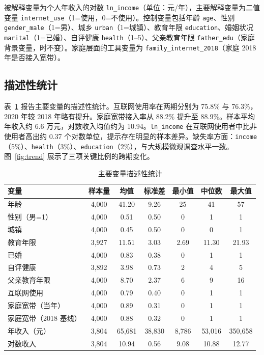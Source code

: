 \documentclass[a4paper,11pt]{article}
\begin{document}
被解释变量为个人年收入的对数 \texttt{ln\_income}（单位：元/年），主要解释变量为二值变量 \texttt{internet\_use}（1=使用，0=不使用）。控制变量包括年龄 \texttt{age}、性别 \texttt{gender\_male}（1=男）、城乡 \texttt{urban}（1=城镇）、教育年限 \texttt{education}、婚姻状况 \texttt{marital}（1=已婚）、自评健康 \texttt{health}（1--5）、父亲教育年限 \texttt{father\_edu}（家庭背景变量，时不变）。家庭层面的工具变量为 \texttt{family\_internet\_2018}（家庭 2018 年是否接入宽带）。

\subsection{描述性统计}

表~\ref{tab:summary} 报告主要变量的描述性统计。互联网使用率在两期分别为 75.8\% 与 76.3\%，2020 年较 2018 年略有提升。家庭宽带接入率从 88.2\% 提升至 88.9\%。样本平均年收入约 6.6 万元，对数收入均值约为 10.94。\texttt{ln\_income} 在互联网使用者中比非使用者高出约 0.37 个对数单位，提示存在明显的样本差异。缺失率方面：\texttt{income}（5\%）、\texttt{health}（3\%）、\texttt{education}（2\%），与大规模微观调查水平一致。图~\ref{fig:trend} 展示了三项关键比例的跨期变化。

\begin{table}[htbp]
\centering
\caption{主要变量描述性统计}
\label{tab:summary}
\begin{tabular}{lcccccc}
\hline\hline
变量 & 样本量 & 均值 & 标准差 & 最小值 & 中位数 & 最大值 \\
\hline
年龄 & 4,000 & 41.20 & 9.26 & 25 & 41 & 57 \\
性别（男=1）& 4,000 & 0.51 & 0.50 & 0 & 1 & 1 \\
城镇 & 4,000 & 0.45 & 0.50 & 0 & 0 & 1 \\
教育年限 & 3,927 & 11.51 & 3.03 & 2.69 & 11.30 & 21.93 \\
已婚 & 4,000 & 0.83 & 0.38 & 0 & 1 & 1 \\
自评健康 & 3,892 & 3.98 & 0.73 & 2 & 4 & 5 \\
父亲教育年限 & 4,000 & 8.70 & 2.37 & 6 & 9 & 16 \\
互联网使用 & 4,000 & 0.79 & 0.40 & 0 & 1 & 1 \\
家庭宽带（当年）& 4,000 & 0.89 & 0.31 & 0 & 1 & 1 \\
家庭宽带（2018 基线）& 4,000 & 0.88 & 0.32 & 0 & 1 & 1 \\
年收入（元）& 3,804 & 65,681 & 38,830 & 8,786 & 53,016 & 350,658 \\
对数收入 & 3,804 & 10.94 & 0.56 & 9.08 & 10.88 & 12.77 \\
\hline\hline
\end{tabular}
\end{table}
\end{document}
